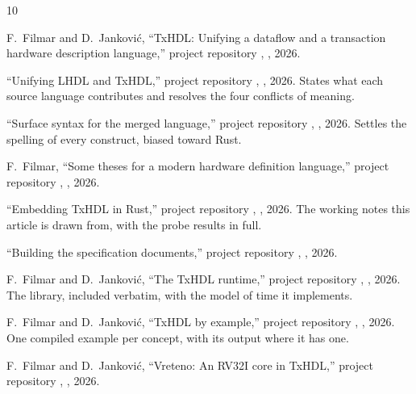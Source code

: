 \documentclass[journal,9pt]{IEEEtran}
\begin{document}
{\footnotesize\tableofcontents}
















\begin{thebibliography}{10}

F.~Filmar and D.~Janković, ``TxHDL: Unifying a dataflow and a transaction
hardware description language,'' project repository ,
, 2026.

``Unifying LHDL and TxHDL,'' project repository ,
, 2026. States what each source language
contributes and resolves the four conflicts of meaning.

``Surface syntax for the merged language,'' project repository
, , 2026. Settles the
spelling of every construct, biased toward Rust.

F.~Filmar, ``Some theses for a modern hardware definition language,''
project repository , , 2026.

``Embedding TxHDL in Rust,'' project repository ,
, 2026. The working notes this article is
drawn from, with the probe results in full.

``Building the specification documents,'' project repository
, , 2026.

F.~Filmar and D.~Janković, ``The TxHDL runtime,'' project repository
, , 2026. The library, included
verbatim, with the model of time it implements.

F.~Filmar and D.~Janković, ``TxHDL by example,'' project repository
, , 2026. One compiled example
per concept, with its output where it has one.

F.~Filmar and D.~Janković, ``Vreteno: An RV32I core in TxHDL,''
project repository , , 2026.


\end{thebibliography}
\end{document}
